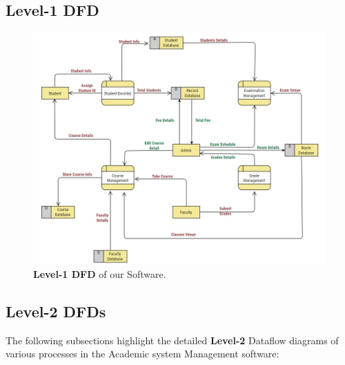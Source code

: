 \documentclass[12pt,a4paper]{article}
\begin{document}
\subsection{Level-1 DFD}
\begin{figure}[H]
    \centering
        \includegraphics[scale=0.67]{Level_1_DFD.jpg} 
    \caption{\textbf{Level-1 DFD} of our Software.}
\end{figure}


\subsection{Level-2 DFDs}
The following subsections highlight the detailed \textbf{Level-2} Dataflow diagrams of various processes in the Academic system Management software:
\end{document}
